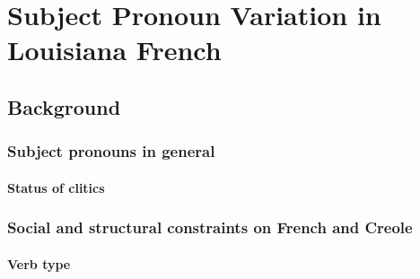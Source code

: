 \chapter{Subject Pronoun Variation in Louisiana French}
  \section{Background}
    \subsection{Subject pronouns in general}
      \subsubsection{Status of clitics}
    \subsection{Social and structural constraints on French and Creole} %
      \subsubsection{Verb type}
